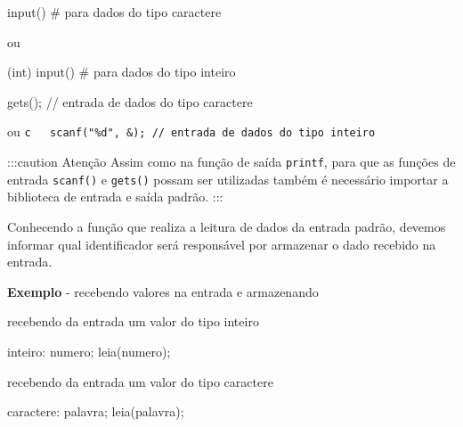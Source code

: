 \documentclass[
  letterpaper,
  DIV=11,
  numbers=noendperiod]{scrreprt}
\newenvironment{Shaded}{\begin{snugshade}}{\end{snugshade}}
\newcommand{\BuiltInTok}[1]{\textcolor[rgb]{0.00,0.23,0.31}{#1}}
\newcommand{\CommentTok}[1]{\textcolor[rgb]{0.37,0.37,0.37}{#1}}
\newcommand{\NormalTok}[1]{\textcolor[rgb]{0.00,0.23,0.31}{#1}}
\newcommand{\OperatorTok}[1]{\textcolor[rgb]{0.37,0.37,0.37}{#1}}
\begin{document}
\begin{Shaded}
\begin{Highlighting}[]
\BuiltInTok{input}\NormalTok{() }\CommentTok{\# para dados do tipo caractere}
\end{Highlighting}
\end{Shaded}

ou

\begin{Shaded}
\begin{Highlighting}[]
\NormalTok{(}\BuiltInTok{int}\NormalTok{) }\BuiltInTok{input}\NormalTok{() }\CommentTok{\# para dados do tipo inteiro}
\end{Highlighting}
\end{Shaded}

\begin{Shaded}
\begin{Highlighting}[]
\NormalTok{gets}\OperatorTok{();} \CommentTok{// entrada de dados do tipo caractere}
\end{Highlighting}
\end{Shaded}

ou
\texttt{c\ \ \ scanf("\%d",\ \&);\ //\ entrada\ de\ dados\ do\ tipo\ inteiro}

:::caution Atenção Assim como na função de saída \texttt{printf}, para
que as funções de entrada \texttt{scanf()} e \texttt{gets()} possam ser
utilizadas também é necessário importar a biblioteca de entrada e saída
padrão. :::

Conhecendo a função que realiza a leitura de dados da entrada padrão,
devemos informar qual identificador será responsável por armazenar o
dado recebido na entrada.

\textbf{Exemplo} - recebendo valores na entrada e armazenando

recebendo da entrada um valor do tipo inteiro

\begin{Shaded}
\begin{Highlighting}[]
\NormalTok{inteiro}\OperatorTok{:}\NormalTok{ numero}\OperatorTok{;}
\NormalTok{leia}\OperatorTok{(}\NormalTok{numero}\OperatorTok{);} 
\end{Highlighting}
\end{Shaded}

recebendo da entrada um valor do tipo caractere

\begin{Shaded}
\begin{Highlighting}[]
\NormalTok{caractere}\OperatorTok{:}\NormalTok{ palavra}\OperatorTok{;}
\NormalTok{leia}\OperatorTok{(}\NormalTok{palavra}\OperatorTok{);}
\end{Highlighting}
\end{Shaded}
\end{document}
